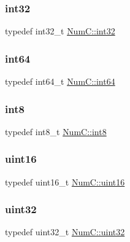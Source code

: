 \subsubsection{\texorpdfstring{int32}{int32}}
{\footnotesize\ttfamily typedef int32\+\_\+t \mbox{\hyperlink{namespace_num_c_aa5a7e69266097d55816d4cdb19542b53}{Num\+C\+::int32}}}

\mbox{\label{namespace_num_c_a96768695f3ea92cc3c4b79d37efb30c6}} 
\subsubsection{\texorpdfstring{int64}{int64}}
{\footnotesize\ttfamily typedef int64\+\_\+t \mbox{\hyperlink{namespace_num_c_a96768695f3ea92cc3c4b79d37efb30c6}{Num\+C\+::int64}}}

\mbox{\label{namespace_num_c_abc49745b062795c3d053780d36613404}} 
\subsubsection{\texorpdfstring{int8}{int8}}
{\footnotesize\ttfamily typedef int8\+\_\+t \mbox{\hyperlink{namespace_num_c_abc49745b062795c3d053780d36613404}{Num\+C\+::int8}}}

\mbox{\label{namespace_num_c_a870ab72deafe3efd4eb63e6a2e63a236}} 
\subsubsection{\texorpdfstring{uint16}{uint16}}
{\footnotesize\ttfamily typedef uint16\+\_\+t \mbox{\hyperlink{namespace_num_c_a870ab72deafe3efd4eb63e6a2e63a236}{Num\+C\+::uint16}}}

\mbox{\label{namespace_num_c_ae685802ca6d3035f2b400b081e3953fa}} 
\subsubsection{\texorpdfstring{uint32}{uint32}}
{\footnotesize\ttfamily typedef uint32\+\_\+t \mbox{\hyperlink{namespace_num_c_ae685802ca6d3035f2b400b081e3953fa}{Num\+C\+::uint32}}}

